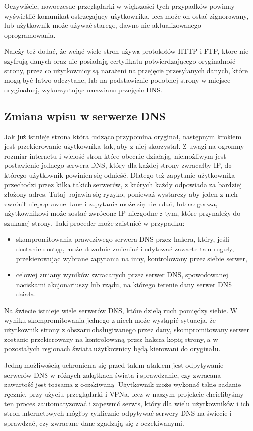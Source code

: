 Oczywiście, nowoczesne przeglądarki w większości tych przypadków powinny wyświetlić komunikat ostrzegający użytkownika, lecz może on ostać zignorowany, lub użytkownik może używać starego, dawno nie aktualizowanego oprogramowania. 

Należy też dodać, że wciąć wiele stron używa protokołów HTTP i FTP, które nie szyfrują danych oraz nie posiadają certyfikatu potwierdzającego oryginalność strony, przez co użytkownicy są narażeni na przejęcie przesyłanych danych, które mogą być łatwo odczytane, lub na podstawienie podobnej strony w miejsce oryginalnej, wykorzystując omawiane przejęcie DNS. 

\subsection{Zmiana wpisu w serwerze DNS}

\hspace{0.5cm} Jak już istnieje strona która łudząco przypomina oryginał, następnym krokiem jest przekierowanie użytkownika tak, aby z niej skorzystał. Z uwagi na ogromny rozmiar internetu i wielość stron które obecnie działają, niemożliwym jest postawienie jednego serwera DNS, który dla każdej strony zwracałby IP, do którego użytkownik powinien się odnieść. Dlatego też zapytanie użytkownika przechodzi przez kilka takich serwerów, z których każdy odpowiada za bardziej złożony adres. Tutaj pojawia się ryzyko, ponieważ wystarczy  aby jeden z nich zwrócił niepoprawne dane i zapytanie może się nie udać, lub co gorsza, użytkownikowi może zostać zwrócone IP niezgodne z tym, które przynależy do szukanej strony. Taki proceder może zaistnieć w przypadku:

\begin{itemize}
\item skompromitowania prawdziwego serwera DNS przez hakera, który, jeśli dostanie dostęp, może dowolnie zmieniać i edytować zawarte tam reguły, przekierowując wybrane zapytania na inny, kontrolowany przez siebie serwer,
\item celowej zmiany wyników zwracanych przez serwer DNS, spowodowanej naciskami akcjonariuszy lub rządu, na którego terenie dany serwer DNS działa.
\end{itemize}

Na świecie istnieje wiele serwerów DNS, które dzielą ruch pomiędzy siebie. W wyniku skompromitowania jednego z niech może wystąpić sytuacja, że użytkownik strony z obszaru obsługiwanego przez dany, skompromitowany serwer zostanie przekierowany na kontrolowaną przez hakera kopię strony, a w pozostałych regionach świata użytkownicy będą kierowani do oryginału. 

Jedną możliwością uchronienia się przed takim atakiem jest odpytywanie serwerów DNS w różnych zakątkach świata i sprawdzanie, czy zwracana zawartość jest tożsama z oczekiwaną. Użytkownik może wykonać takie zadanie ręcznie, przy użyciu przeglądarki i VPNa, lecz w naszym projekcie chcielibyśmy ten proces zautomatyzować i zapewnić serwis, który dla wielu użytkowników i ich stron internetowych mógłby cyklicznie odpytywać serwery DNS na świecie i sprawdzać, czy zwracane dane zgadzają się z oczekiwanymi.
